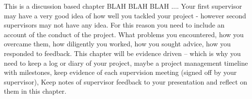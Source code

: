 This is a discussion based chapter BLAH BLAH BLAH ....
Your first supervisor may have a very good idea of how well you tackled your project - however second supervisors may not have any idea.  For this reason you need to include an account of the conduct of the project. What problems you encountered, how you overcame them, how diligently you worked, how you sought advice, how you responded to feedback. This chapter will be evidence driven – which is why you need to keep a log or diary of your project, maybe a project management timeline with milestones, keep evidence of each supervision meeting (signed off by your supervisor), Keep notes of supervisor feedback to your presentation and reflect on them in this chapter.